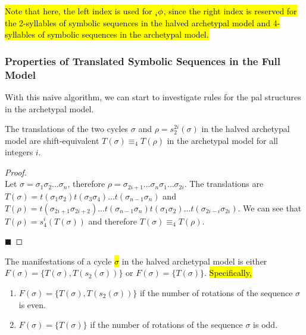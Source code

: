\hl{
	Note that here, the left index is used for $\prescript{}{i}{\phi}$, since the right index is reserved for the 2-syllables of symbolic sequences in the halved archetypal model and 4-syllables of symbolic sequences in the archetypal model.
}

\subsubsection{Properties of Translated Symbolic Sequences in the Full Model}

With this naive algorithm, we can start to investigate rules for the \gls{pal} structures in the archetypal model.

\begin{lemma}
	\label{lemma:equivalence.translations}
	The translations of the two cycles $\sigma$ and $\rho = s_2^{2i}(\sigma)$ in the halved archetypal model are shift-equivalent $T(\sigma) \equiv_4 T(\rho)$ in the archetypal model for all integers $i$.
\end{lemma}

\begin{proof} \phantom{x} \\
	Let $\sigma = \sigma_1\sigma_2 \dots \sigma_n$, therefore $\rho = \sigma_{2i+1} \dots \sigma_n\sigma_1 \dots \sigma_{2i}$.
	The translations are $T(\sigma) = t(\sigma_1\sigma_2)t(\sigma_3\sigma_4) \dots t(\sigma_{n-1}\sigma_n)$
	and $T(\rho) = t(\sigma_{2i+1}\sigma_{2i+2}) \dots t(\sigma_{n-1}\sigma_n)t(\sigma_1\sigma_2) \dots t(\sigma_{2i-i}\sigma_{2i})$.
	We can see that $T(\rho) = s_4^i(T(\sigma))$ and therefore $T(\sigma) \equiv_4 T(\rho)$.

	\hfill $\blacksquare$
\end{proof}

\begin{theorem}
	\label{theorem:coexistence.even}
	The manifestations of a cycle \hl{$\sigma$} in the halved archetypal model is either $F(\sigma) = \{T(\sigma), T(s_2(\sigma))\}$ or $F(\sigma) = \{T(\sigma)\}$.
	\hl{Specifically,} \begin{enumerate}
		\item $F(\sigma) = \{T(\sigma), T(s_2(\sigma))\}$ if the number of rotations of the sequence $\sigma$ is even.
		\item $F(\sigma) = \{T(\sigma)\}$ if the number of rotations of the sequence $\sigma$ is odd.
	\end{enumerate}
\end{theorem}

